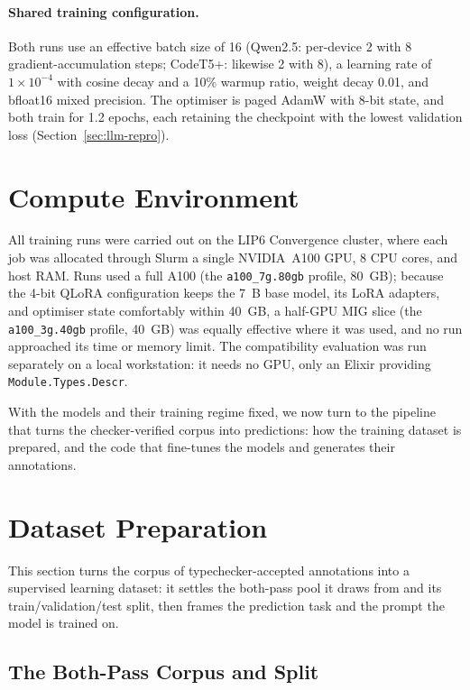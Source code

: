 \paragraph{Shared training configuration.}
Both runs use an effective batch size of 16 (Qwen2.5: per-device 2 with 8 gradient-accumulation steps; CodeT5+: likewise 2 with 8), a learning rate of $1 \times 10^{-4}$ with cosine decay and a 10\% warmup ratio, weight decay 0.01, and bfloat16 mixed precision.
The optimiser is paged AdamW with 8-bit state, and both train for 1.2 epochs, each retaining the checkpoint with the lowest validation loss (Section~\ref{sec:llm-repro}).

\section{Compute Environment}
\label{sec:llm-compute}
All training runs were carried out on the LIP6 Convergence cluster, where each job was allocated through Slurm a single NVIDIA~A100 GPU, 8 CPU cores, and host RAM.
Runs used a full A100 (the \texttt{a100\_7g.80gb} profile, 80~GB); because the 4-bit QLoRA configuration keeps the 7~B base model, its LoRA adapters, and optimiser state comfortably within 40~GB, a half-GPU MIG slice (the \texttt{a100\_3g.40gb} profile, 40~GB) was equally effective where it was used, and no run approached its time or memory limit.
The compatibility evaluation was run separately on a local workstation: it needs no GPU, only an Elixir providing \texttt{Module.Types.Descr}.

With the models and their training regime fixed, we now turn to the pipeline that turns the checker-verified corpus into predictions: how the training dataset is prepared, and the code that fine-tunes the models and generates their annotations.

\section{Dataset Preparation}
\label{sec:llm-dataset}

This section turns the corpus of typechecker-accepted annotations into a supervised learning dataset: it settles the both-pass pool it draws from and its train/validation/test split, then frames the prediction task and the prompt the model is trained on.

\subsection{The Both-Pass Corpus and Split}
\label{sec:llm-data-prep}

